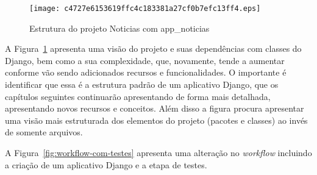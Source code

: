 \documentclass[brazil,a4paper,oneside,openright,parskip=full]{book}
\begin{document}
\begin{figure}
\hypertarget{fig:estrutura-noticias-completo}{%
\centering
\texttt{[image: c4727e6153619ffc4c183381a27cf0b7efc13ff4.eps]}
\caption{Estrutura do projeto Noticias com
app\_noticias\label{fig:estrutura-noticias-completo}}\label{fig:estrutura-noticias-completo}
}
\end{figure}

A Figura~\ref{fig:estrutura-noticias-completo} apresenta uma visão do
projeto e suas dependências com classes do Django, bem como a sua
complexidade, que, novamente, tende a aumentar conforme vão sendo
adicionados recursos e funcionalidades. O importante é identificar que
essa é a estrutura padrão de um aplicativo Django, que os capítulos
seguintes continuarão apresentando de forma mais detalhada, apresentando
novos recursos e conceitos. Além disso a figura procura apresentar uma
visão mais estruturada dos elementos do projeto (pacotes e classes) ao
invés de somente arquivos.

A Figura~\ref{fig:workflow-com-testes} apresenta uma alteração no
\emph{workflow} incluindo a criação de um aplicativo Django e a etapa de
testes.
\end{document}
